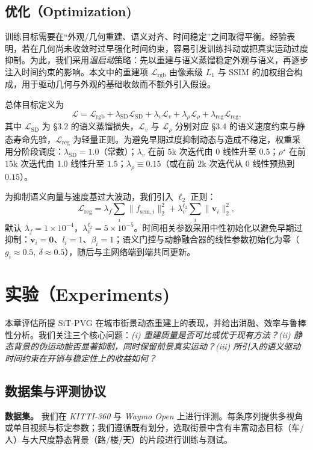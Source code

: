 \documentclass[10pt,conference]{IEEEtran} %
\begin{document}
\subsection{优化（Optimization)}
训练目标需要在“外观/几何重建、语义对齐、时间稳定”之间取得平衡。经验表明，若在几何尚未收敛时过早强化时间约束，容易引发训练抖动或把真实运动过度抑制。为此，我们采用\emph{温启动}策略：先以重建与语义蒸馏稳定外观与语义，再逐步注入时间约束的影响。本文中的重建项 $\mathcal L_{\mathrm{rgb}}$ 由像素级 $L_1$ 与 SSIM 的加权组合构成，用于驱动几何与外观的基础收敛而不额外引入假设。

总体目标定义为
\begin{equation}
\mathcal L=\mathcal L_{\mathrm{rgb}}+\lambda_{\mathrm{SD}}\mathcal L_{\mathrm{SD}}
+\lambda_v \mathcal L_v+\lambda_\rho \mathcal L_\rho+\lambda_{\mathrm{reg}}\mathcal L_{\mathrm{reg}}.
\label{eq:opt_total}
\end{equation}
其中 $\mathcal L_{\mathrm{SD}}$ 为 §3.2 的语义蒸馏损失，$\mathcal L_v$ 与 $\mathcal L_\rho$ 分别对应 §3.4 的语义速度约束与静态寿命先验，$\mathcal L_{\mathrm{reg}}$ 为轻量正则。为避免早期过度抑制动态与造成不稳定，权重采用分阶段调度：$\lambda_{\mathrm{SD}}{=}1.0$（常数）；$\lambda_v$ 在前 $5$k 次迭代由 $0$ 线性升至 $0.5$；$\rho^\star$ 在前 $15$k 次迭代由 $1.0$ 线性升至 $1.5$；$\lambda_\rho\equiv 0.15$（或在前 $2$k 次迭代从 $0$ 线性预热到 $0.15$）。

为抑制语义向量与速度基过大波动，我们引入 $\ell_2$ 正则：
\begin{equation}
\mathcal L_{\mathrm{reg}}=\lambda_f\sum_i \|f_{\mathrm{sem},i}\|_2^2+\lambda_v^{\ell_2}\sum_i \|{\bm v}_i\|_2^2,
\end{equation}
默认 $\lambda_f{=}1\!\times\!10^{-4}$，$\lambda_v^{\ell_2}{=}5\!\times\!10^{-5}$。时间相关参数采用中性初始化以避免早期过抑制：${\bm v}_i{=}\bm{0}$、$l_i{=}1$、$\beta_i{=}1$；语义门控与动静融合器的线性参数初始化为零（$g_i\!\approx\!0.5,\ \delta\!\approx\!0.5$），随后与主网络端到端共同更新。



\section{实验（Experiments)}
本章评估所提 SiT\mbox{-}PVG 在城市街景动态重建上的表现，并给出消融、效率与鲁棒性分析。我们关注三个核心问题：\emph{(i) 重建质量是否可比或优于现有方法？(ii) 静态背景的伪运动能否显著抑制，同时保留前景真实运动？(iii) 所引入的语义驱动时间约束在开销与稳定性上的收益如何？}

\subsection{数据集与评测协议}
\textbf{数据集。} 我们在 \emph{KITTI\mbox{-}360} 与 \emph{Waymo Open} 上进行评测。每条序列提供多视角或单目视频与标定参数；我们遵循既有划分，选取街景中含有丰富动态目标（车/人）与大尺度静态背景（路/楼/天）的片段进行训练与测试。
\end{document}
